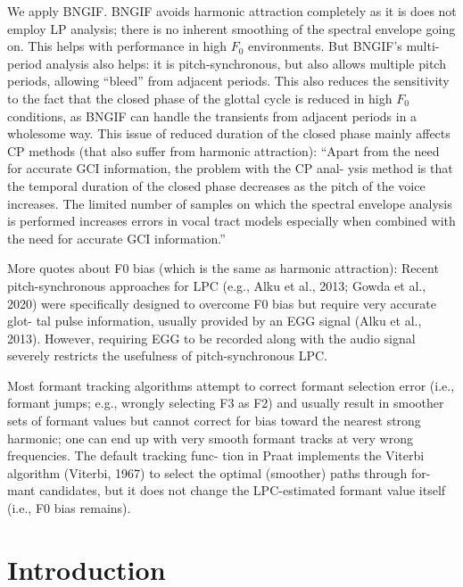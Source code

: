 \begin{chaptersections}{%
We apply BNGIF.
}
BNGIF avoids harmonic attraction completely as it is does not employ LP analysis; there is no inherent smoothing of the spectral envelope going on.
This helps with performance in high $F_0$ environments.
But BNGIF's multi-period analysis also helps: it is pitch-synchronous, but also allows multiple pitch periods, allowing ``bleed'' from adjacent periods.
This also reduces the sensitivity to the fact that the closed phase of the glottal cycle is reduced in high $F_0$ conditions, as BNGIF can handle the transients from adjacent periods in a wholesome way.
This issue of reduced duration of the closed phase mainly affects CP methods (that also suffer from harmonic attraction):
``Apart from the need
for accurate GCI information, the problem with the CP anal-
ysis method is that the temporal duration of the closed phase
decreases as the pitch of the voice increases. The limited number
of samples on which the spectral envelope analysis is performed
increases errors in vocal tract models especially when combined
with the need for accurate GCI information.'' \citep{Airaksinen2014}

More quotes about F0 bias (which is the same as harmonic attraction):
Recent pitch-synchronous approaches for LPC (e.g.,
Alku et al., 2013; Gowda et al., 2020) were specifically
designed to overcome F0 bias but require very accurate glot-
tal pulse information, usually provided by an EGG signal
(Alku et al., 2013). However, requiring EGG to be recorded
along with the audio signal severely restricts the usefulness
of pitch-synchronous LPC. \citep{Whalen2022}

Most formant tracking algorithms attempt to correct
formant selection error (i.e., formant jumps; e.g., wrongly
selecting F3 as F2) and usually result in smoother sets of
formant values but cannot correct for bias toward the nearest
strong harmonic; one can end up with very smooth formant
tracks at very wrong frequencies. The default tracking func-
tion in Praat implements the Viterbi algorithm (Viterbi,
1967) to select the optimal (smoother) paths through for-
mant candidates, but it does not change the LPC-estimated
formant value itself (i.e., F0 bias remains). \citep{Whalen2022}




\section{Introduction}


\end{chaptersections}
